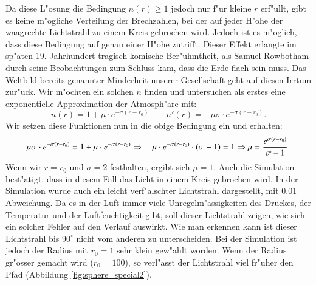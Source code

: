 \begin{refsection}
Da diese L"osung die Bedingung $n(r) \geq 1$ jedoch nur f"ur kleine $r$ erf"ullt, gibt es keine m"ogliche Verteilung der Brechzahlen, bei der auf jeder H"ohe der waagrechte Lichtstrahl zu einem Kreis gebrochen wird. 
Jedoch ist es m"oglich, dass diese Bedingung auf genau einer H"ohe zutrifft. 
Dieser Effekt erlangte im sp"aten 19. Jahrhundert tragisch-komische Ber"uhmtheit, als Samuel Rowbotham durch seine Beobachtungen zum Schluss kam, dass die Erde flach sein muss. 
Das Weltbild bereits genannter Minderheit\cite{licht:flatearthsociety} unserer Gesellschaft geht auf diesen Irrtum zur"uck.
Wir m"ochten ein solchen $n$ finden und untersuchen als erstes eine exponentielle Approximation der Atmosph"are mit:
$$n(r) = 1 + \mu \cdot e^{-\sigma (r-r_0)} \qquad n'(r) = -\mu \sigma \cdot e^{-\sigma (r-r_0)}.$$
Wir setzen diese Funktionen nun in die obige Bedingung ein und erhalten:
$$\mu \sigma \cdot e^{-\sigma (r-r_0)} = 1 + \mu \cdot e^{-\sigma (r-r_0)} \quad \\
\Rightarrow \quad \mu \cdot e^{-\sigma (r-r_0)} \cdot (\sigma - 1) = 1 \\
\Rightarrow \mu = \frac{e^{\sigma (r-r_0)}}{\sigma - 1}.$$
Wenn wir $r = r_0$ und $\sigma = 2$ festhalten, ergibt sich $\mu = 1$. 
Auch die Simulation best"atigt, dass in diesem Fall das Licht in einem Kreis gebrochen wird.
In der Simulation wurde auch ein leicht verf"alschter Lichtstrahl dargestellt, mit 0.01 Abweichung. 
Da es in der Luft immer viele Unregelm"assigkeiten des Druckes, der Temperatur und der Luftfeuchtigkeit gibt, soll dieser Lichtstrahl zeigen, wie sich ein solcher Fehler auf den Verlauf auswirkt.
Wie man erkennen kann ist dieser Lichtstrahl bis $90^\circ$ nicht vom anderen zu unterscheiden.
Bei der Simulation ist jedoch der Radius mit $r_0=1$ sehr klein gew"ahlt worden. 
Wenn der Radius gr"osser gemacht wird ($r_0 = 100$), so  verl"asst der Lichtstrahl viel fr"uher den Pfad (Abbildung \ref{fig:sphere_special2}). 


\end{refsection}
